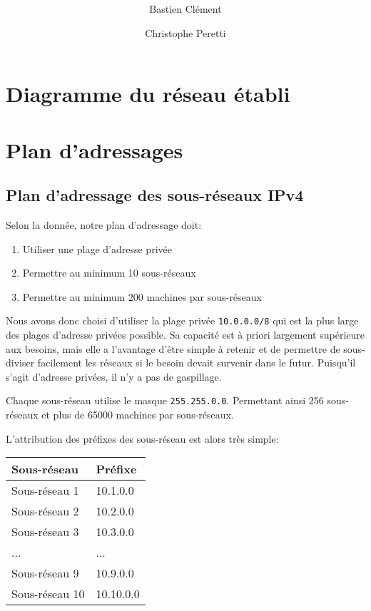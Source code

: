 \documentclass[11pt,a4paper]{article}
\author{Bastien Clément \and Christophe Peretti}
\title{{\normalsize \doccourse} \\ \doctitle }
\begin{document}
\maketitle
\vspace{1em}

\section{Diagramme du réseau établi}

\section{Plan d'adressages}

\subsection{Plan d'adressage des sous-réseaux IPv4}

Selon la donnée, notre plan d'adressage doit:

\begin{enumerate}
	\item Utiliser une plage d'adresse privée
	\item Permettre au minimum 10 sous-réseaux
	\item Permettre au minimum 200 machines par sous-réseaux
\end{enumerate}

Nous avons donc choisi d'utiliser la plage privée \texttt{10.0.0.0/8} qui est la plus large des plages d'adresse privées possible. Sa capacité est à priori largement supérieure aux besoins, mais elle a l'avantage d'être simple à retenir et de permettre de sous-diviser facilement les réseaux si le besoin devait survenir dans le futur. Puisqu'il s'agit d'adresse privées, il n'y a pas de gaspillage.

Chaque sous-réseau utilise le masque \texttt{255.255.0.0}. Permettant ainsi 256 sous-réseaux et plus de 65000 machines par sous-réseaux.

L'attribution des préfixes des sous-réseau est alors très simple:

\begin{tabular}{|l|l|}
	\hline
	\textbf{Sous-réseau} & \textbf{Préfixe} \\
	\hline
	Sous-réseau 1 & 10.1.0.0 \\
	Sous-réseau 2 & 10.2.0.0 \\
	Sous-réseau 3 & 10.3.0.0 \\
	... & ... \\
	Sous-réseau 9 & 10.9.0.0 \\
	Sous-réseau 10 & 10.10.0.0 \\
	\hline
\end{tabular}
\vspace{1em}
\end{document}
